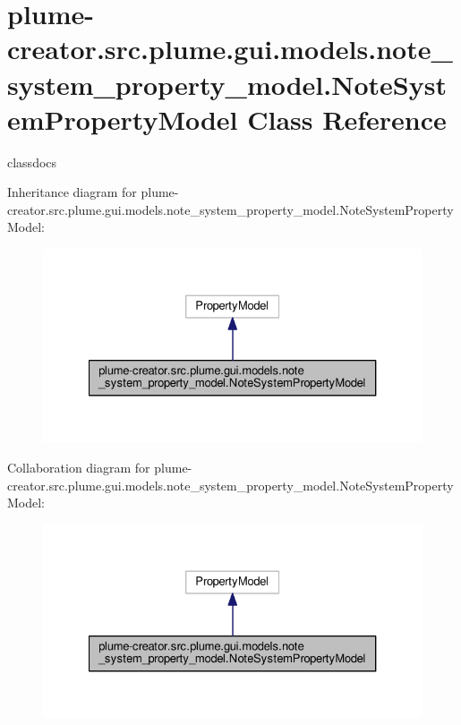 \hypertarget{classplume-creator_1_1src_1_1plume_1_1gui_1_1models_1_1note__system__property__model_1_1_note_system_property_model}{}\section{plume-\/creator.src.\+plume.\+gui.\+models.\+note\+\_\+system\+\_\+property\+\_\+model.\+Note\+System\+Property\+Model Class Reference}
\label{classplume-creator_1_1src_1_1plume_1_1gui_1_1models_1_1note__system__property__model_1_1_note_system_property_model}


classdocs  




Inheritance diagram for plume-\/creator.src.\+plume.\+gui.\+models.\+note\+\_\+system\+\_\+property\+\_\+model.\+Note\+System\+Property\+Model\+:\nopagebreak
\begin{figure}[H]
\begin{center}
\leavevmode
\includegraphics[width=327pt]{classplume-creator_1_1src_1_1plume_1_1gui_1_1models_1_1note__system__property__model_1_1_note_sy9887897af19993f636be65977cec0fd0}
\end{center}
\end{figure}


Collaboration diagram for plume-\/creator.src.\+plume.\+gui.\+models.\+note\+\_\+system\+\_\+property\+\_\+model.\+Note\+System\+Property\+Model\+:\nopagebreak
\begin{figure}[H]
\begin{center}
\leavevmode
\includegraphics[width=327pt]{classplume-creator_1_1src_1_1plume_1_1gui_1_1models_1_1note__system__property__model_1_1_note_sy1866b663e398a0ad3a64491559b22fd6}
\end{center}
\end{figure}
